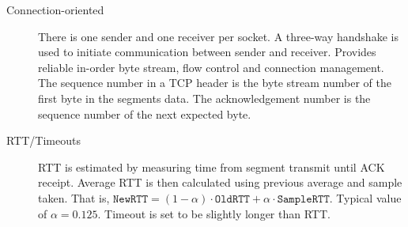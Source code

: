 \documentclass{article}
\begin{document}
\begin{description}
    \item[Connection-oriented] There is one sender and one receiver per socket. A three-way handshake
    is used to initiate communication between sender and receiver. Provides reliable in-order byte stream,
    flow control and connection management. The sequence number in a TCP header is the byte stream
    number of the first byte in the segments data. The acknowledgement number is the sequence number
    of the next expected byte. 
    
    \item[RTT/Timeouts] RTT is estimated by measuring time from segment transmit until ACK receipt.
    Average RTT is then calculated using previous average and sample taken. That is, 
    $\texttt{NewRTT}=(1-\alpha)\cdot\texttt{OldRTT}+\alpha\cdot\texttt{SampleRTT}.$
    Typical value of $\alpha=0.125$. Timeout is set to be slightly longer than RTT.
    

\end{description}
\end{document}

